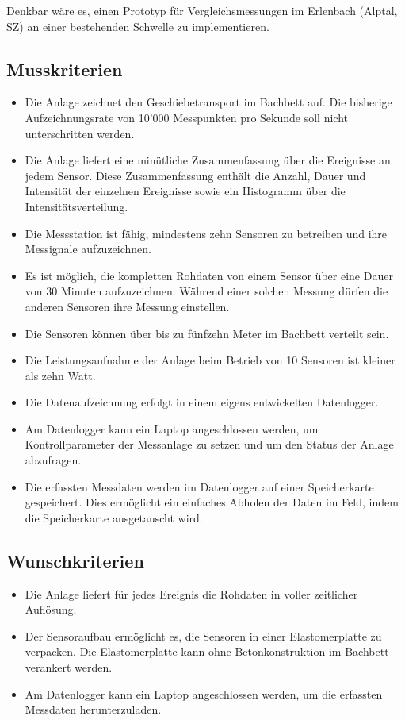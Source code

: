 Denkbar wäre es, einen Prototyp für Vergleichsmessungen im Erlenbach (Alptal, SZ) an einer bestehenden Schwelle zu implementieren.


\subsection{Musskriterien}
\begin{itemize}
\item Die Anlage zeichnet den Geschiebetransport im Bachbett auf. Die bisherige Aufzeichnungsrate von 10'000 Messpunkten pro Sekunde soll nicht unterschritten werden.
\item Die Anlage liefert eine minütliche Zusammenfassung über die Ereignisse an jedem Sensor. Diese Zusammenfassung enthält die Anzahl, Dauer und Intensität der einzelnen Ereignisse sowie ein Histogramm über die Intensitätsverteilung.
\item Die Messstation ist fähig, mindestens zehn Sensoren zu betreiben und ihre Messignale aufzuzeichnen.
\item Es ist möglich, die kompletten Rohdaten von einem Sensor über eine Dauer von 30 Minuten aufzuzeichnen. Während einer solchen Messung dürfen die anderen Sensoren ihre Messung einstellen.
\item Die Sensoren können über bis zu fünfzehn Meter im Bachbett verteilt sein.
\item Die Leistungsaufnahme der Anlage beim Betrieb von 10 Sensoren ist kleiner als zehn Watt.
\item Die Datenaufzeichnung erfolgt in einem eigens entwickelten Datenlogger.
\item Am Datenlogger kann ein Laptop angeschlossen werden, um Kontrollparameter der Messanlage zu setzen und um den Status der Anlage abzufragen.
\item Die erfassten Messdaten werden im Datenlogger auf einer Speicherkarte gespeichert. Dies ermöglicht ein einfaches Abholen der Daten im Feld, indem die Speicherkarte ausgetauscht wird.
\end{itemize}
\subsection{Wunschkriterien}
\begin{itemize}
\item Die Anlage liefert für jedes Ereignis die Rohdaten in voller zeitlicher Auflösung.
\item Der Sensoraufbau ermöglicht es, die Sensoren in einer Elastomerplatte zu verpacken. Die Elastomerplatte kann ohne Betonkonstruktion im Bachbett verankert werden.
\item Am Datenlogger kann ein Laptop angeschlossen werden, um die erfassten Messdaten herunterzuladen.
\end{itemize}
